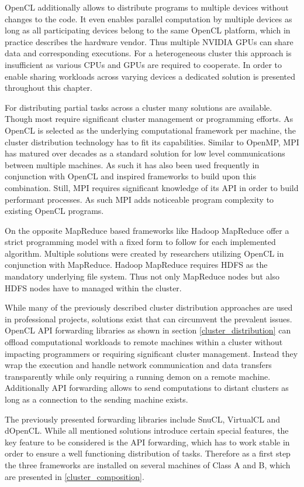 OpenCL additionally allows to distribute programs to multiple devices without changes to the code. It even enables parallel computation by multiple devices as long as all participating devices belong to the same OpenCL platform, which in practice describes the hardware vendor. Thus multiple NVIDIA GPUs can share data and corresponding executions. For a heterogeneous cluster this approach is insufficient as various CPUs and GPUs are required to cooperate. In order to enable sharing workloads across varying devices a dedicated solution is presented throughout this chapter.

For distributing partial tasks across a cluster many solutions are available. Though most require significant cluster management or programming efforts. As OpenCL is selected as the underlying computational framework per machine, the cluster distribution technology has to fit its capabilities.
Similar to OpenMP, MPI has matured over decades as a standard solution for low level communications between multiple machines. As such it has also been used frequently in conjunction with OpenCL and inspired frameworks to build upon this combination. Still, MPI requires significant knowledge of its API in order to build performant processes. As such MPI adds noticeable program complexity to existing OpenCL programs.

On the opposite MapReduce based frameworks like Hadoop MapReduce offer a strict programming model with a fixed form to follow for each implemented algorithm. Multiple solutions were created by researchers utilizing OpenCL in conjunction with MapReduce. Hadoop MapReduce requires HDFS as the mandatory underlying file system. Thus not only MapReduce nodes but also HDFS nodes have to managed within the cluster.

While many of the previously described cluster distribution approaches are used in professional projects, solutions exist that can circumvent the prevalent issues. OpenCL API forwarding libraries as shown in section \ref{cluster_distribution} can offload computational workloads to remote machines within a cluster without impacting programmers or requiring significant cluster management. Instead they wrap the execution and handle network communication and data transfers transparently while only requiring a running demon on a remote machine. Additionally API forwarding allows to send computations to distant clusters as long as a connection to the sending machine exists. 

The previously presented forwarding libraries include SnuCL, VirtualCL and dOpenCL. While all mentioned solutions introduce certain special features, the key feature to be considered is the API forwarding, which has to work stable in order to ensure a well functioning distribution of tasks. Therefore as a first step the three frameworks are installed on several machines of Class A and B, which are presented in \ref{cluster_composition}.

